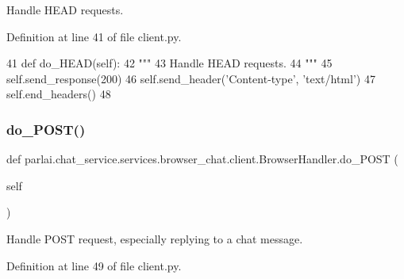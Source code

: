 \begin{DoxyVerb}Handle HEAD requests.
\end{DoxyVerb}
 

Definition at line 41 of file client.\+py.


\begin{DoxyCode}
41     \textcolor{keyword}{def }do\_HEAD(self):
42         \textcolor{stringliteral}{"""}
43 \textcolor{stringliteral}{        Handle HEAD requests.}
44 \textcolor{stringliteral}{        """}
45         self.send\_response(200)
46         self.send\_header(\textcolor{stringliteral}{'Content-type'}, \textcolor{stringliteral}{'text/html'})
47         self.end\_headers()
48 
\end{DoxyCode}
\mbox{\label{classparlai_1_1chat__service_1_1services_1_1browser__chat_1_1client_1_1BrowserHandler_ab1502fd0b8faee9c61c7147237e4bcaf}} 
\subsubsection{\texorpdfstring{do\+\_\+\+P\+O\+S\+T()}{do\_POST()}}
{\footnotesize\ttfamily def parlai.\+chat\+\_\+service.\+services.\+browser\+\_\+chat.\+client.\+Browser\+Handler.\+do\+\_\+\+P\+O\+ST (\begin{DoxyParamCaption}\item[{}]{self }\end{DoxyParamCaption})}

\begin{DoxyVerb}Handle POST request, especially replying to a chat message.
\end{DoxyVerb}
 

Definition at line 49 of file client.\+py.


